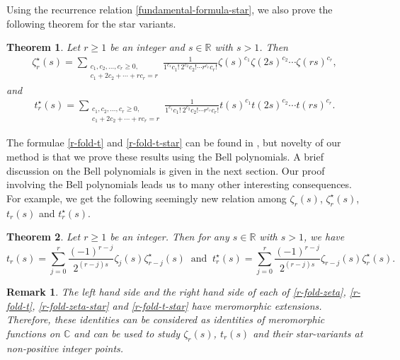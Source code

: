 \documentclass[12pt]{amsart}
\newcommand{\C}{{\mathbb C}}
\newcommand{\R}{{\mathbb R}}
\newtheorem{thm}{Theorem}
\newtheorem{rmk}{Remark}
\begin{document}
Using the recurrence relation \eqref{fundamental-formula-star}, we also prove the following theorem for the star variants.

\begin{thm}\label{main-thm-2}
Let $r\geq 1$ be an integer and $s\in \R$ with $s>1$. Then
\begin{align}\label{r-fold-zeta-star}
\zeta^{\star}_r(s)=\sum_{ \substack{c_1,c_2, \ldots,c_r \geq 0, \\c_1+2c_2+\cdots+rc_r=r}}\frac{1}{1^{c_1}c_1! \ 2^{c_2}c_2!\cdots r^{c_r}c_r!}\zeta(s)^{c_1}\zeta(2s)^{c_2}\cdots \zeta(rs)^{c_r},
\end{align}
and 
\begin{align}\label{r-fold-t-star}
t^{\star}_r(s)=\sum_{ \substack{c_1,c_2, \ldots,c_r \geq 0, \\c_1+2c_2+\cdots+rc_r=r}}\frac{1}{1^{c_1}c_1! \ 2^{c_2}c_2!\cdots r^{c_r}c_r!}t(s)^{c_1}t(2s)^{c_2}\cdots t(rs)^{c_r}.
\end{align}
\end{thm}

The formulae \eqref{r-fold-t} and \eqref{r-fold-t-star} can be found in \cite[Corollary 3.1-3.2]{H2}, but novelty of our method is that we prove these results using the Bell polynomials. A brief discussion on the Bell polynomials is given in the next section. Our proof involving the Bell polynomials leads us to many other interesting consequences. For example, we get the following seemingly new relation among $\zeta_r(s)$, $\zeta_r^{\star}(s)$, $t_r(s)$ and $t_r^{\star}(s)$.

\begin{thm}\label{cor-int-rel} 
Let $r\geq 1$ be an integer.  Then for any $s\in \R$ with $s>1$, we have
$$
t_r(s)=\sum_{j=0}^{r}\frac{(-1)^{r-j}}{2^{(r-j)s}}\zeta_j(s)\zeta^{\star}_{r-j}(s) \ \text{ and }\
t^{\star}_r(s)=\sum_{j=0}^{r}\frac{(-1)^{r-j}}{2^{(r-j)s}}\zeta_{r-j}(s)\zeta^{\star}_{r}(s).
$$
\end{thm}

\begin{rmk}\rm
The left hand side and the right hand side of each of \eqref{r-fold-zeta},  \eqref{r-fold-t}, \eqref{r-fold-zeta-star} and \eqref{r-fold-t-star} have meromorphic extensions. Therefore, these identities can be considered as identities of meromorphic functions on $\C$ and can be used to study $\zeta_r(s)$, $t_r(s)$ and their star-variants at non-positive integer points. 
\end{rmk}
\end{document}
